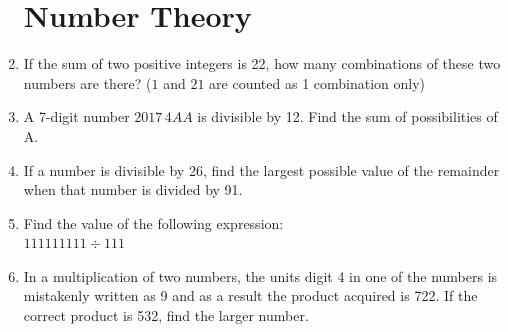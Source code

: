 \documentclass[11pt]{scrartcl}
\begin{document}
\begin{enumerate}
    \section{Number Theory}
    \item If the sum of two positive integers is 22, how many combinations of these two numbers are there? ($1$ and $21$ are counted as 1 combination only)
    \vspace{10cm} \item A 7-digit number $2017\,4AA$ is divisible by 12. Find the sum of possibilities of A.
    \vspace{10cm} \item If a number is divisible by 26, find the largest possible value of the remainder when that number is divided by 91.
    \vspace{10cm} \item Find the value of the following expression: \\
        $111111111 \div 111$
    \vspace{10cm} \item In a multiplication of two numbers, the units digit 4 in one of the numbers is mistakenly written as 9 and as a result the product acquired is 722. If the correct product is 532, find the larger number.

    \newpage

\end{enumerate}
\end{document}
